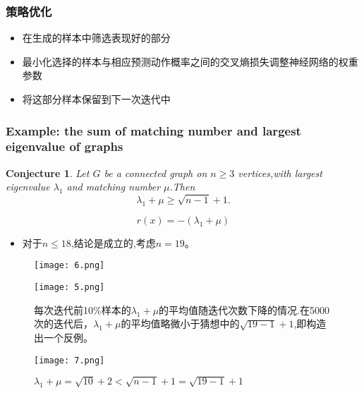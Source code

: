 \documentclass[CJK,aspectratio=169]{beamer}  %
\newtheorem{conjecture}{Conjecture}
\begin{document}
	\begin{frame}
		\frametitle{策略优化}
		\begin{itemize}
			\item 在生成的样本中筛选表现好的部分
			\item 最小化选择的样本与相应预测动作概率之间的交叉熵损失调整神经网络的权重参数
			\item 将这部分样本保留到下一次迭代中
		\end{itemize}
	\end{frame}
	\begin{frame}
		\frametitle{Example: the sum of matching number and largest eigenvalue of graphs}
		\begin{conjecture}
			Let $G$ be a connected graph on $n \geq 3$ vertices,with largest eigenvalue $\lambda_1$ and matching number $\mu$.Then
			$$\lambda_1+\mu\geq\sqrt{n-1}+1.$$
		\end{conjecture}
		$$r(x)=-(\lambda_1+\mu)$$
		\begin{itemize}
			\item 对于$n\leq 18$,结论是成立的,考虑$n=19$。
		\end{itemize}
	\end{frame}
	\begin{frame}
		\begin{figure}
			\texttt{[image: 6.png]}
		\end{figure}
	\end{frame}
	\begin{frame}
		\begin{figure}
			\begin{minipage}[b]{0.48\textwidth}
				\centering
				\texttt{[image: 5.png]}
				\captionsetup{font=tiny}
				\caption{每次迭代前10$\%$样本的$\lambda_1+\mu$的平均值随迭代次数下降的情况.在5000次的迭代后，$\lambda_1+\mu$的平均值略微小于猜想中的$\sqrt{19-1}+1$,即构造出一个反例。}
			\end{minipage}
			\begin{minipage}[t]{0.48\textwidth}
				\centering
				\vspace{-4cm}
				\texttt{[image: 7.png]}
				\captionsetup{font=tiny}
				
				\caption*{$\lambda_1+\mu=\sqrt{10}+2<\sqrt{n-1}+1=\sqrt{19-1}+1$}
			\end{minipage}
		\end{figure}
	\end{frame}
\end{document}

